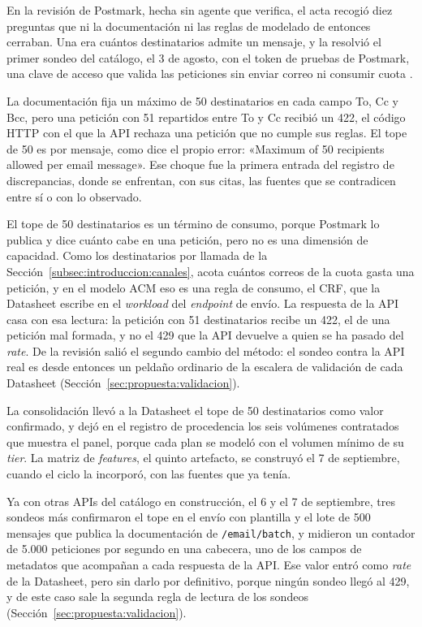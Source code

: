En la revisión de Postmark, hecha sin agente que verifica, el acta recogió diez preguntas que ni la documentación ni las reglas de modelado de entonces cerraban.
Una era cuántos destinatarios admite un mensaje, y la resolvió el primer sondeo del catálogo, el 3 de agosto, con el token de pruebas de Postmark, una clave de acceso que valida las peticiones sin enviar correo ni consumir cuota \citep{postmarkapi}.

La documentación fija un máximo de 50 destinatarios en cada campo To, Cc y Bcc, pero una petición con 51 repartidos entre To y Cc recibió un 422, el código HTTP con el que la API rechaza una petición que no cumple sus reglas.
El tope de 50 es por mensaje, como dice el propio error: «Maximum of 50 recipients allowed per email message».
Ese choque fue la primera entrada del registro de discrepancias, donde se enfrentan, con sus citas, las fuentes que se contradicen entre sí o con lo observado.

El tope de 50 destinatarios es un término de consumo, porque Postmark lo publica y dice cuánto cabe en una petición, pero no es una dimensión de capacidad.
Como los destinatarios por llamada de la Sección~\ref{subsec:introduccion:canales}, acota cuántos correos de la cuota gasta una petición, y en el modelo ACM eso es una regla de consumo, el CRF, que la Datasheet escribe en el \textit{workload} del \textit{endpoint} de envío.
La respuesta de la API casa con esa lectura: la petición con 51 destinatarios recibe un 422, el de una petición mal formada, y no el 429 que la API devuelve a quien se ha pasado del \textit{rate}.
De la revisión salió el segundo cambio del método: el sondeo contra la API real es desde entonces un peldaño ordinario de la escalera de validación de cada Datasheet (Sección~\ref{sec:propuesta:validacion}).

La consolidación llevó a la Datasheet el tope de 50 destinatarios como valor confirmado, y dejó en el registro de procedencia los seis volúmenes contratados que muestra el panel, porque cada plan se modeló con el volumen mínimo de su \textit{tier}.
La matriz de \textit{features}, el quinto artefacto, se construyó el 7 de septiembre, cuando el ciclo la incorporó, con las fuentes que ya tenía.

Ya con otras APIs del catálogo en construcción, el 6 y el 7 de septiembre, tres sondeos más confirmaron el tope en el envío con plantilla y el lote de 500 mensajes que publica la documentación de \texttt{/email/batch}, y midieron un contador de 5.000 peticiones por segundo en una cabecera, uno de los campos de metadatos que acompañan a cada respuesta de la API.
Ese valor entró como \textit{rate} de la Datasheet, pero sin darlo por definitivo, porque ningún sondeo llegó al 429, y de este caso sale la segunda regla de lectura de los sondeos (Sección~\ref{sec:propuesta:validacion}).

